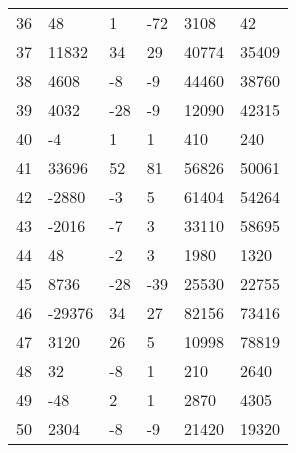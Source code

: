 \documentclass{amsart}
\begin{document}
\begin{longtable}{llllll}
36 & 48 & 1 & -72 & 3108 & 42\\
37 & 11832 & 34 & 29 & 40774 & 35409\\
38 & 4608 & -8 & -9 & 44460 & 38760\\
39 & 4032 & -28 & -9 & 12090 & 42315\\
40 & -4 & 1 & 1 & 410 & 240\\
41 & 33696 & 52 & 81 & 56826 & 50061\\
42 & -2880 & -3 & 5 & 61404 & 54264\\
43 & -2016 & -7 & 3 & 33110 & 58695\\
44 & 48 & -2 & 3 & 1980 & 1320\\
45 & 8736 & -28 & -39 & 25530 & 22755\\
46 & -29376 & 34 & 27 & 82156 & 73416\\
47 & 3120 & 26 & 5 & 10998 & 78819\\
48 & 32 & -8 & 1 & 210 & 2640\\
49 & -48 & 2 & 1 & 2870 & 4305\\
50 & 2304 & -8 & -9 & 21420 & 19320\\
\hline
\end{longtable}
\end{document}
